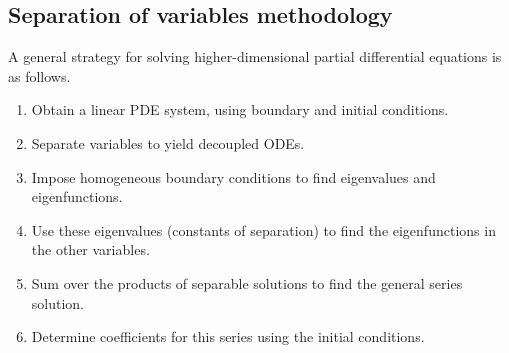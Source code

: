 \subsection{Separation of variables methodology}
A general strategy for solving higher-dimensional partial differential equations is as follows.
\begin{enumerate}
	\item Obtain a linear PDE system, using boundary and initial conditions.
	\item Separate variables to yield decoupled ODEs.
	\item Impose homogeneous boundary conditions to find eigenvalues and eigenfunctions.
	\item Use these eigenvalues (constants of separation) to find the eigenfunctions in the other variables.
	\item Sum over the products of separable solutions to find the general series solution.
	\item Determine coefficients for this series using the initial conditions.
\end{enumerate}

